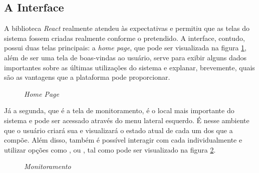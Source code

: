 \subsection{A Interface}
\label{sec:a_interface}

A biblioteca \textit{React} realmente atendeu às expectativas e permitiu que as telas do sistema fossem criadas realmente conforme o pretendido. A interface, contudo, possui duas telas principais: a \textit{home page}, que pode ser visualizada na figura \ref{fig:home_page}, além de ser uma tela de boas-vindas ao usuário, serve para exibir alguns dados importantes sobre as últimas utilizações do sistema e explanar, brevemente, quais são as vantagens que a plataforma pode proporcionar.

\begin{figure}[H]
    \centering
    \caption{\textit{Home Page}}
    \label{fig:home_page}
\end{figure}

Já a segunda, que é a tela de monitoramento, é o local mais importante do sistema e pode ser acessado através do menu lateral esquerdo. É nesse ambiente que o usuário criará sua \dockerNetwork{} e visualizará o estado atual de cada um dos \containers{} que a compõe. Além disso, também é possível interagir com cada \conteiner{} individualmente e utilizar opções como ,  ou , tal como pode ser visualizado na figura \ref{fig:monitoramento}.

\begin{figure}[!htb]
    \centering
    \caption{\textit{Monitoramento}}
    \label{fig:monitoramento}
\end{figure}

